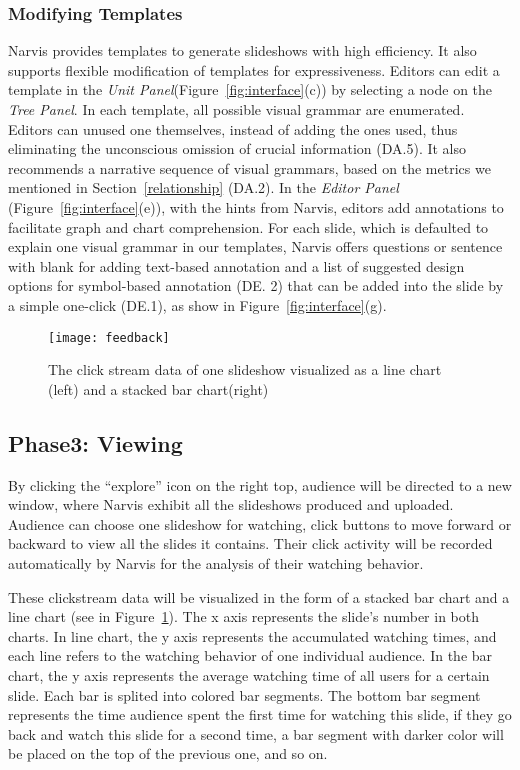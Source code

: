 \subsubsection{Modifying Templates} 
Narvis provides templates to generate slideshows with high efficiency. 
It also supports flexible modification of templates for expressiveness.
Editors can edit a template in the \textit{Unit Panel}(Figure~\ref{fig:interface}(c)) by selecting a node on the \textit{Tree Panel}. In each template, all possible visual grammar are enumerated. Editors can unused one themselves, instead of adding the ones used, thus eliminating the unconscious omission of crucial information (DA.5).
It also recommends a narrative sequence of visual grammars, based on the metrics we mentioned in Section~\ref{relationship} (DA.2). 
In the \textit{Editor Panel} (Figure~\ref{fig:interface}(e)), with the hints from Narvis, editors add annotations to facilitate graph and chart comprehension. For each slide, which is defaulted to explain one visual grammar in our templates, Narvis offers questions or sentence with blank for adding text-based annotation and a list of suggested design options for symbol-based annotation (DE. 2) that can be added into the slide by a simple one-click (DE.1), as show in Figure~\ref{fig:interface}(g).



\begin{figure}
 \centering 
 \texttt{[image: feedback]}
 \caption{The click stream data of one slideshow visualized as a line chart (left) and a stacked bar chart(right)}
 \label{fig:feedback}
\end{figure}


\subsection{Phase3: Viewing}
By clicking the ``explore'' icon on the right top, audience will be directed to a new window, where Narvis exhibit all the slideshows produced and uploaded.
Audience can choose one slideshow for watching, click buttons to move forward or backward to view all the slides it contains. Their click activity will be recorded automatically by Narvis for the analysis of their watching behavior. 

These clickstream data will be visualized in the form of a stacked bar chart and a line chart (see in Figure~\ref{fig:feedback}).  
The x axis represents the slide's number in both charts. In line chart, the y axis represents the accumulated watching times, and each line refers to the watching behavior of one individual audience. In the bar chart, the y axis represents the average watching time of all users for a certain slide. Each bar is splited into colored bar segments. The bottom bar segment represents the time audience spent the first time for watching this slide, if they go back and watch this slide for a second time, a bar segment with darker color will be placed on the top of the previous one, and so on. 

